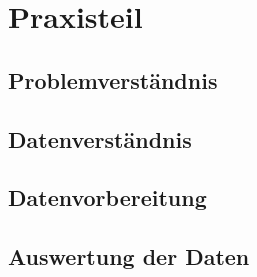 \section{Praxisteil}


\subsection{Problemverständnis}

\subsection{Datenverständnis}

\subsection{Datenvorbereitung}

\subsection{Auswertung der Daten}

\clearpage